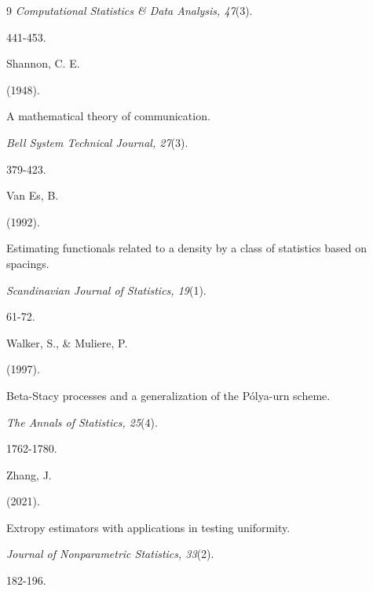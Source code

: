 \documentclass[10pt,twoside]{article}
\numberwithin{equation}{section}
\begin{document}
\begin{thebibliography}{9}
\textit{Computational Statistics \& Data Analysis, 47}(3).

441-453.



Shannon, C. E. 

(1948). 

A mathematical theory of communication. 

\textit{Bell System Technical Journal, 27}(3).

379-423. 



Van Es, B. 

(1992). 

Estimating functionals related to a density by a class of statistics based on spacings. 

\textit{Scandinavian Journal of Statistics, 19}(1).

61-72.



Walker, S., \& Muliere, P. 

(1997). 

Beta-Stacy processes and a generalization of the Pólya-urn scheme. 

\textit{The Annals of Statistics, 25}(4).

1762-1780.



Zhang, J. 

(2021). 

Extropy estimators with applications in testing uniformity. 

\textit{Journal of Nonparametric Statistics, 33}(2).

182-196.  

\end{thebibliography}
\end{document}
